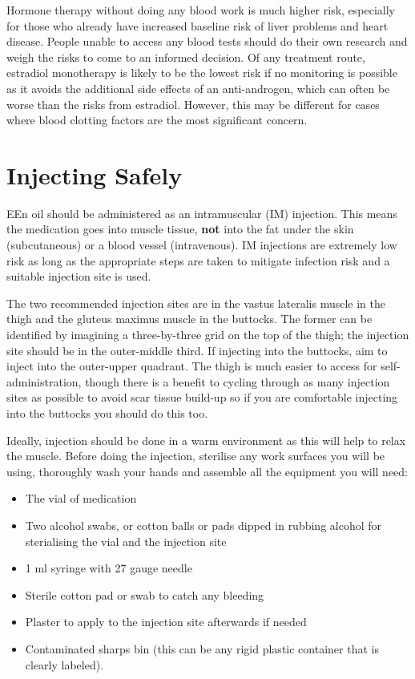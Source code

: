 \documentclass[twoside,a5paper]{article}
\begin{document}
Hormone therapy without doing any blood work is much higher risk,
especially for those who already have increased baseline risk of liver
problems and heart disease.  People unable to access any blood tests
should do their own research and weigh the risks to come to an
informed decision.  Of any treatment route, estradiol monotherapy is
likely to be the lowest risk if no monitoring is possible as it avoids
the additional side effects of an anti-androgen, which can often be
worse than the risks from estradiol.  However, this may be different
for cases where blood clotting factors are the most significant
concern.

\section{Injecting Safely}

EEn oil should be administered as an intramuscular (IM) injection.
This means the medication goes into muscle tissue, \textbf{not} into
the fat under the skin (subcutaneous) or a blood vessel (intravenous).
IM injections are extremely low risk as long as the appropriate steps
are taken to mitigate infection risk and a suitable injection site is
used.

The two recommended injection sites are in the vastus lateralis muscle
in the thigh and the gluteus maximus muscle in the buttocks.  The
former can be identified by imagining a three-by-three grid on the top
of the thigh; the injection site should be in the outer-middle third.
If injecting into the buttocks, aim to inject into the outer-upper
quadrant.  The thigh is much easier to access for self-administration,
though there is a benefit to cycling through as many injection sites
as possible to avoid scar tissue build-up so if you are comfortable
injecting into the buttocks you should do this too.

Ideally, injection should be done in a warm environment as this will
help to relax the muscle.  Before doing the injection, sterilise any
work surfaces you will be using, thoroughly wash your hands and
assemble all the equipment you will need:

\begin{itemize}
\item The vial of medication
\item Two alcohol swabs, or cotton balls or pads dipped in rubbing
  alcohol for sterialising the vial and the injection site
\item 1 ml syringe with 27 gauge needle
\item Sterile cotton pad or swab to catch any bleeding
\item Plaster to apply to the injection site afterwards if needed
\item Contaminated sharps bin (this can be any rigid plastic container
  that is clearly labeled).
\end{itemize}
\end{document}

